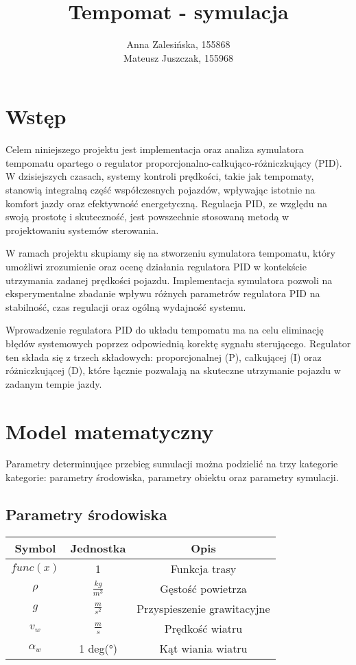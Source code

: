 \documentclass[12pt,a4paper]{article}
\begin{document}
	\title{Tempomat - symulacja}
	\author{Anna Zalesińska, 155868 \\ Mateusz Juszczak, 155968}
	\date{}
	\maketitle
	\section{Wstęp}
	Celem niniejszego projektu jest implementacja oraz analiza symulatora tempomatu opartego o regulator proporcjonalno-całkująco-różniczkujący (PID). W dzisiejszych czasach, systemy kontroli prędkości, takie jak tempomaty, stanowią integralną część współczesnych pojazdów, wpływając istotnie na komfort jazdy oraz efektywność energetyczną. Regulacja PID, ze względu na swoją prostotę i skuteczność, jest powszechnie stosowaną metodą w projektowaniu systemów sterowania.
	
	W ramach projektu skupiamy się na stworzeniu symulatora tempomatu, który umożliwi zrozumienie oraz ocenę działania regulatora PID w kontekście utrzymania zadanej prędkości pojazdu. Implementacja symulatora pozwoli na eksperymentalne zbadanie wpływu różnych parametrów regulatora PID na stabilność, czas regulacji oraz ogólną wydajność systemu.
	
	Wprowadzenie regulatora PID do układu tempomatu ma na celu eliminację błędów systemowych poprzez odpowiednią korektę sygnału sterującego. Regulator ten składa się z trzech składowych: proporcjonalnej (P), całkującej (I) oraz różniczkującej (D), które łącznie pozwalają na skuteczne utrzymanie pojazdu w zadanym tempie jazdy.
	
	\section{Model matematyczny}
	Parametry determinujące przebieg sumulacji można podzielić na trzy kategorie kategorie: parametry środowiska, parametry obiektu oraz parametry symulacji.
	
	\subsection{Parametry środowiska}
		\begin{center}
			\begin{tabular}{|c|c|c|}
				\hline
				Symbol & Jednostka & Opis \\
				\hline
				\hline
				$func(x)$ & 1 & Funkcja trasy \\
				\hline
				$\rho$ & $\frac{kg}{m^3}$ & Gęstość powietrza \\
				\hline
				$g$ & $\frac{m}{s^2}$ & Przyspieszenie grawitacyjne\\
				\hline
				$v_w$ & $\frac{m}{s}$ & Prędkość wiatru \\
				\hline
				$\alpha_w$ & 1 deg(°) & Kąt wiania wiatru \\
				\hline
			\end{tabular}
		\end{center}
	
\end{document}
